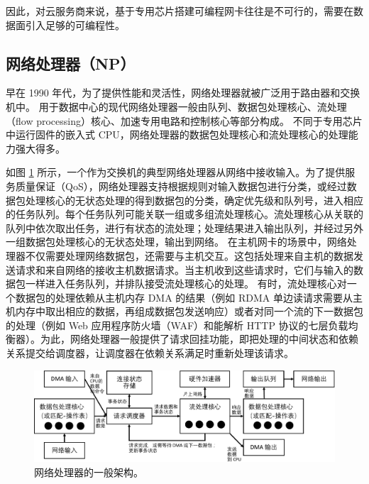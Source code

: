 因此，对云服务商来说，基于专用芯片搭建可编程网卡往往是不可行的，需要在数据面引入足够的可编程性。






\subsection{网络处理器（NP）}
\label{smartnic-np}

早在 1990 年代，为了提供性能和灵活性，网络处理器就被广泛用于路由器和交换机中。
用于数据中心的现代网络处理器一般由队列、数据包处理核心、流处理（flow processing）核心、加速专用电路和控制核心等部分构成。
不同于专用芯片中运行固件的嵌入式 CPU，网络处理器的数据包处理核心和流处理核心的处理能力强大得多。

如图 \ref{background:fig:network_processor} 所示，一个作为交换机的典型网络处理器从网络中接收输入。为了提供服务质量保证（QoS），网络处理器支持根据规则对输入数据包进行分类，或经过数据包处理核心的无状态处理的得到数据包的分类，确定优先级和队列号，进入相应的任务队列。每个任务队列可能关联一组或多组流处理核心。流处理核心从关联的队列中依次取出任务，进行有状态的流处理；处理结果进入输出队列，并经过另外一组数据包处理核心的无状态处理，输出到网络。
在主机网卡的场景中，网络处理器不仅需要处理网络数据包，还需要与主机交互。这包括处理来自主机的数据发送请求和来自网络的接收主机数据请求。当主机收到这些请求时，它们与输入的数据包一样进入任务队列，并排队接受流处理核心的处理。
有时，流处理核心对一个数据包的处理依赖从主机内存 DMA 的结果（例如 RDMA 单边读请求需要从主机内存中取出相应的数据，再组成数据包发送响应）或者对同一个流的下一数据包的处理（例如 Web 应用程序防火墙（WAF）和能解析 HTTP 协议的七层负载均衡器）。为此，网络处理器一般提供了请求回挂功能，即把处理的中间状态和依赖关系提交给调度器，让调度器在依赖关系满足时重新处理该请求。


\begin{figure}[htbp]
	\centering
	\includegraphics[width=1.0\textwidth]{figures/network_processor.pdf}
	\caption{网络处理器的一般架构。}
	\label{background:fig:network_processor}
\end{figure}


